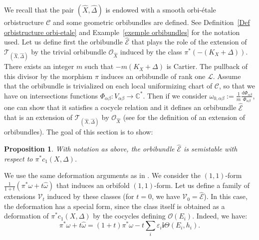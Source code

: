 \documentclass[12pt,a4paper]{amsart}
\newcommand{\C}{\mathbb{C}}
\theoremstyle{plain}
\newtheorem{prop}[theo]{Proposition}
\theoremstyle{definition}
\begin{document}
We recall that the pair $(\widehat{X}, \widehat{\Delta})$ is endowed with a smooth orbi-\'etale orbistructure $\mathcal{C}$ and some geometric orbibundles are defined. See Definition~\ref{Def orbistructure orbi-etale} and Example~\ref{exemple orbibundles} for the notation used. Let us define first the orbibundle $\widehat{\mathcal{E}}$ that plays the role of the extension of $\mathcal{T}_{(\widehat{X}, \widehat{\Delta})}$ by the trivial orbibundle $\mathcal{O}_{\widehat{X}}$ induced by the class $\pi^*(-(K_X + \Delta))$. There exists an integer $m$ such that $-m(K_X + \Delta)$ is Cartier. The pullback of this divisor by the morphism $\pi$ induces an orbibundle of rank one $\mathcal{L}$. Assume that the orbibundle is trivialized on each local uniformizing chart of $\mathcal{C}$, so that we have on intersections functions $\Phi_{\alpha\beta} : V_{\alpha\beta} \longrightarrow \C^*$. Then if we consider $\omega_{0, \alpha\beta} := \frac{1}{m} \frac{\mathrm{d}\Phi_{\alpha\beta}}{\Phi_{\alpha\beta}}$, one can show that it satisfies a cocycle relation and it defines an orbibundle $\widehat{\mathcal{E}}$ that is an extension of $\mathcal{T}_{(\widehat{X}, \widehat{\Delta})}$ by $\mathcal{O}_{\widehat{X}}$ (see \cite[Prop.~2.20]{Dai25} for the definition of an extension of orbibundles). The goal of this section is to show:

\begin{prop}
    With notation as above, the orbibundle $\widehat{\mathcal{E}}$ is semistable with respect to $\pi^*c_1(X, \Delta)$.
\end{prop}

We use the same deformation arguments as in \cite[Proof of Thm.~11]{DGP24}. We consider the $(1,1)$-form $\frac{1}{1+t}(\pi^*\omega + t \widehat{\omega})$ that induces an orbifold $(1,1)$-form. Let us define a family of extensions $\mathcal{V}_t$ induced by these classes (for $t = 0$, we have $\mathcal{V}_0 = \widehat{\mathcal{E}}$). In this case, the deformation has a special form, since the class itself is obtained as a deformation of $\pi^*c_1(X, \Delta)$ by the cocycles defining $\mathcal{O}(E_i)$. Indeed, we have:
$$
\pi^*\omega + t\widehat{\omega} = (1+t)\pi^* \omega -t\sum_i \varepsilon_i \textbf{i}\Theta(E_i, h_i).
$$
\end{document}
